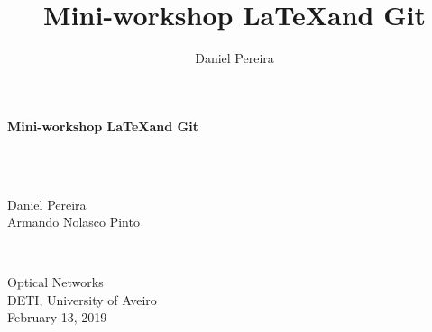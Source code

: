 \documentclass[usenames,dvipsnames,aspectratio=169]{beamer}
\title{Mini-workshop \LaTeX and Git}
\author{Daniel Pereira}
\institute{Departamento de Física - Universidade de Aveiro}
\begin{document}
{
%
\begin{frame}
\color{black} \sffamily \noindent \large
\hspace*{1cm}
\begin{minipage}{10cm}
\vspace*{.4cm}
\begin{flushleft}
 \color{title} \sffamily \noindent \Large
\textbf{Mini-workshop \LaTeX and Git}
\end{flushleft}
\end{minipage}
\vspace*{.8cm}\\
%
~\\
\hspace*{1cm}
\begin{minipage}{3cm}
\color{author}
\large Daniel Pereira\\
Armando Nolasco Pinto
\end{minipage}
%
\vspace*{.8cm}\\
\hspace*{1cm}
\begin{minipage}{6cm}
\color{title}
\large Optical Networks\\
DETI, University of Aveiro\\
February 13, 2019
\end{minipage}
\end{frame}
}


\end{document}
